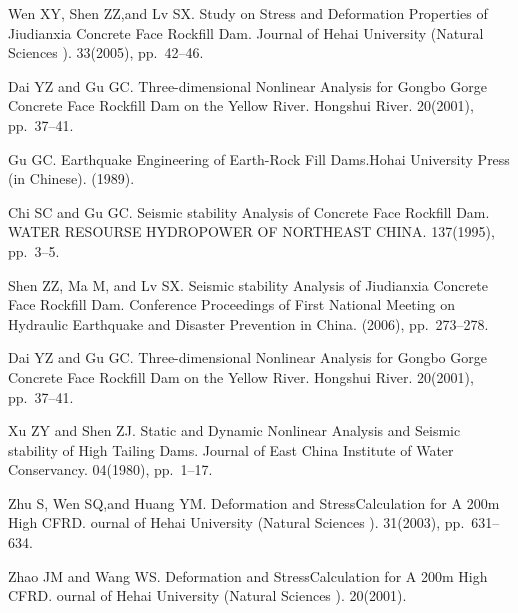 
\begin{thebibliography}{09}
{\sc Wen XY, Shen ZZ,and Lv SX}. {Study on Stress and Deformation Properties of Jiudianxia Concrete Face Rockfill Dam}. Journal of Hehai University (Natural Sciences ). 33(2005), pp.~42--46.

{\sc Dai YZ and Gu GC}. {Three-dimensional Nonlinear Analysis for Gongbo Gorge Concrete Face Rockfill Dam on the Yellow River}. Hongshui River. 20(2001), pp.~37--41.

{\sc Gu GC}. {Earthquake Engineering of Earth-Rock Fill Dams}.Hohai University Press (in Chinese). (1989).

{\sc Chi SC and Gu GC}. {Seismic stability Analysis of Concrete Face Rockfill Dam}. WATER RESOURSE HYDROPOWER OF NORTHEAST CHINA. 137(1995), pp.~3--5.

{\sc Shen ZZ, Ma M, and Lv SX}. {Seismic stability Analysis of Jiudianxia Concrete Face Rockfill Dam}. Conference Proceedings of First National Meeting on Hydraulic Earthquake and Disaster Prevention in China. (2006), pp.~273--278.

{\sc Dai YZ and  Gu GC}. {Three-dimensional Nonlinear Analysis for Gongbo Gorge Concrete Face Rockfill Dam on the Yellow River}. Hongshui River. 20(2001), pp.~37--41.

{\sc Xu ZY and Shen ZJ}. {Static and Dynamic Nonlinear Analysis and Seismic stability of High Tailing Dams}. Journal of East China Institute of Water Conservancy. 04(1980), pp.~1--17.

{\sc Zhu S, Wen SQ,and Huang YM}. {Deformation and StressCalculation for A 200m High CFRD}. ournal of Hehai University (Natural Sciences ). 31(2003), pp.~631--634.

{\sc Zhao JM and Wang WS}. {Deformation and StressCalculation for A 200m High CFRD}. ournal of Hehai University (Natural Sciences ). 20(2001).
\end{thebibliography}